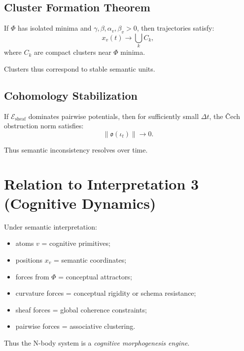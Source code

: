 \subsection{Cluster Formation Theorem}

\begin{theorem}
If $\Phi$ has isolated minima and
$\gamma,\beta,\alpha_v,\beta_v>0$,
then trajectories satisfy:
\[
  x_v(t) \to \bigcup_k C_k,
\]
where $C_k$ are compact clusters near $\Phi$ minima.
\end{theorem}

Clusters thus correspond to stable semantic units.


\subsection{Cohomology Stabilization}

\begin{theorem}
If $\mathcal{E}_{\mathrm{sheaf}}$ dominates pairwise potentials,
then for sufficiently small $\Delta t$,
the Čech obstruction norm satisfies:
\[
  \|\mathfrak{o}(\iota_t)\| \to 0.
\]
\end{theorem}

Thus semantic inconsistency resolves over time.


\section{Relation to Interpretation 3 (Cognitive Dynamics)}

Under semantic interpretation:

\begin{itemize}
  \item atoms $v$ = cognitive primitives;
  \item positions $x_v$ = semantic coordinates;
  \item forces from $\Phi$ = conceptual attractors;
  \item curvature forces = conceptual rigidity or schema resistance;
  \item sheaf forces = global coherence constraints;
  \item pairwise forces = associative clustering.
\end{itemize}

Thus the N-body system is a \emph{cognitive morphogenesis engine}.


